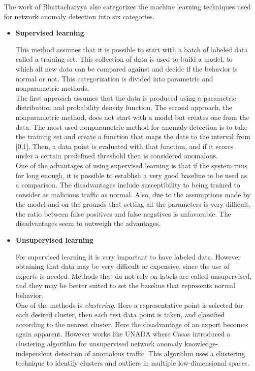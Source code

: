 The work of Bhattacharyya \etAl also categorizes the machine learning techniques used for network anomaly detection into six categories. 
	\begin{itemize}
		\item \textbf{Supervised learning}
		
This method assumes that it is possible to start with a batch of labeled data called a training set. This collection of data is used to build a model, to which all new data can be compared against and decide if the behavior is normal or not. This categorization is divided into parametric and nonparametric methods. \\
The first approach assumes that the data is produced using a parametric distribution and probability density function.
The second approach, the nonparametric method, does not start with a model but creates one from the data. The most used nonparametric method for anomaly detection is to take the training set and create a function that maps the date to the interval from [0,1]. Then, a data point is evaluated with that function, and if it scores under a certain predefined threshold then is considered anomalous.\\
One of the advantages of using supervised learning is that if the system runs for long enough, it is possible to establish a very good baseline to be used as a comparison. The disadvantages include susceptibility to being trained to consider as malicious traffic as normal. Also, due to the assumptions made by the model and on the grounds that setting all the parameters is very difficult, the ratio between false positives and false negatives is unfavorable. The disadvantages seem to outweigh the advantages.\\

		\item \textbf{Unsupervised learning}
		
For supervised learning it is very important to have labeled data. However obtaining that data may be very difficult or expensive, since the use of experts is needed. Methods that do not rely on labels are called unsupervised, and they may be better suited to set the baseline that represents normal behavior. \\

One of the methods is \textit{clustering}. Here a representative point is selected for each desired cluster, then each test data point is taken, and classified according to the nearest cluster. Here the disadvantage of an expert becomes again apparent. However works like UNADA\cite{unada} where Casas \etAl{} introduced a clustering algorithm for unsupervised network anomaly knowledge-independent detection of anomalous traffic. This algorithm uses a clustering technique to identify clusters and outliers in multiple low-dimensional spaces.\\


\end{itemize}
